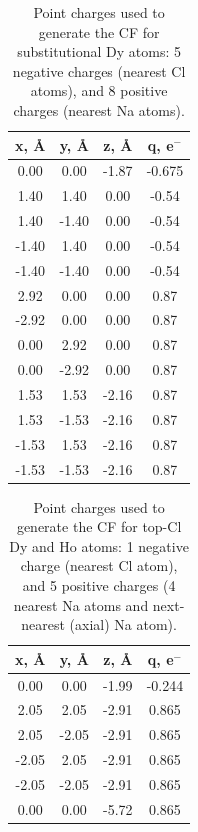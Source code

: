 { \begin{table}[h!]
\caption{Point charges used to generate the CF for substitutional Dy atoms: 5 negative charges (nearest Cl atoms), and 8 positive charges (nearest Na atoms).}
  \label{tabsubst}
\renewcommand{\arraystretch}{1.03}
\begin{ruledtabular}
  \begin{tabular}{ c c c c }
   \multicolumn{1}{c}{x, \AA} & \multicolumn{1}{c}{y, \AA} & \multicolumn{1}{c}{z, \AA} & \multicolumn{1}{c}{q, e$^-$} \\
   \hline
   0.00 & 0.00 & -1.87 & -0.675 \\
   1.40 & 1.40 & 0.00 & -0.54 \\
   1.40 & -1.40 & 0.00 & -0.54 \\
   -1.40 & 1.40 & 0.00 & -0.54 \\
   -1.40 & -1.40 & 0.00 & -0.54 \\
   2.92 & 0.00 & 0.00 & 0.87 \\
   -2.92 & 0.00 & 0.00 & 0.87 \\
   0.00 & 2.92 & 0.00 & 0.87 \\
   0.00 & -2.92 & 0.00 & 0.87 \\
   1.53 & 1.53 & -2.16 & 0.87 \\
   1.53 & -1.53 & -2.16 & 0.87 \\
   -1.53 & 1.53 & -2.16 & 0.87 \\
   -1.53 & -1.53 & -2.16 & 0.87 \\
  \end{tabular}
\end{ruledtabular}
\end{table}

\begin{table}[h!]
\caption{Point charges used to generate the CF for top-Cl Dy and Ho atoms: 1 negative charge (nearest Cl atom), and 5 positive charges (4 nearest Na atoms and next-nearest (axial) Na atom).}
  \label{tabtop}
\renewcommand{\arraystretch}{1.03}
\begin{ruledtabular}
  \begin{tabular}{ c c c c }
   \multicolumn{1}{c}{x, \AA} & \multicolumn{1}{c}{y, \AA} & \multicolumn{1}{c}{z, \AA} & \multicolumn{1}{c}{q, e$^-$} \\
   \hline
   0.00 & 0.00 & -1.99 & -0.244 \\
   2.05 & 2.05 & -2.91 & 0.865 \\
   2.05 & -2.05 & -2.91 & 0.865 \\
   -2.05 & 2.05 & -2.91 & 0.865 \\
   -2.05 & -2.05 & -2.91 & 0.865 \\
   0.00 & 0.00 & -5.72 & 0.865 \\
  \end{tabular}
  \end{ruledtabular}
 \end{table}

}
